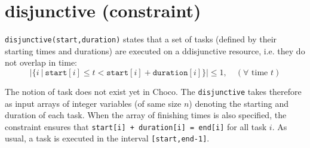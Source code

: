 \label{disjunctive}
\hypertarget{disjunctive}{}

\section{disjunctive (constraint)}\label{disjunctive:disjunctiveconstraint}\hypertarget{disjunctive:disjunctiveconstraint}{}

\begin{notedef}
  \texttt{disjunctive(start,duration)} states that a set of tasks (defined by their starting times and durations) are executed on a ddisjunctive resource, i.e. they do not overlap in time:
$$|\{i\ |\ \mathtt{start}[i]\le t < \mathtt{start}[i]+\mathtt{duration}[i]\}| \le 1,\quad (\forall \text{ time } t)$$
\end{notedef}

The notion of task does not exist yet in Choco. The \texttt{disjunctive} takes therefore as input arrays of integer variables (of same size $n$) denoting the starting and duration of each task. When the array of finishing times is also specified, the constraint ensures that \texttt{start[i] + duration[i] = end[i]} for all task $i$.
As usual, a task is executed in the interval \texttt{[start,end-1]}.

